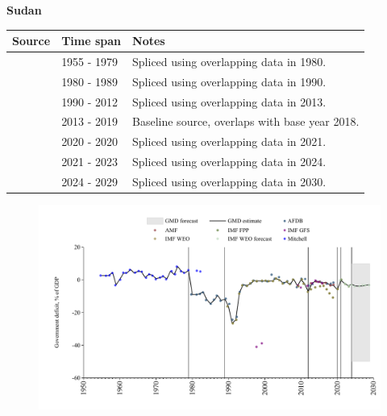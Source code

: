 \documentclass[12pt,a4paper,landscape]{article}
\begin{document}
\begin{adjustbox}{max totalsize={\paperwidth}{\paperheight},center}
\begin{minipage}[t][\textheight][t]{\textwidth}
\vspace*{0.5cm}
{}
\begin{center}
{\Large\bfseries Sudan}
\end{center}
\vspace{0.5cm}
\begin{table}[H]
\centering
\small
\begin{tabular}{|l|l|l|}
\hline
\textbf{Source} & \textbf{Time span} & \textbf{Notes} \\
\hline
\rowcolor{white}\cite{Mitchell}& 1955 - 1979 &Spliced using overlapping data in 1980.\\
\rowcolor{lightgray}\cite{AFDB}& 1980 - 1989 &Spliced using overlapping data in 1990.\\
\rowcolor{white}\cite{IMF_WEO}& 1990 - 2012 &Spliced using overlapping data in 2013.\\
\rowcolor{lightgray}\cite{AMF}& 2013 - 2019 &Baseline source, overlaps with base year 2018.\\
\rowcolor{white}\cite{IMF_WEO}& 2020 - 2020 &Spliced using overlapping data in 2021.\\
\rowcolor{lightgray}\cite{IMF_FPP}& 2021 - 2023 &Spliced using overlapping data in 2024.\\
\rowcolor{white}\cite{IMF_WEO_forecast}& 2024 - 2029 &Spliced using overlapping data in 2030.\\
\hline
\end{tabular}
\end{table}
\begin{figure}[H]
\centering
\includegraphics[width=\textwidth,height=0.6\textheight,keepaspectratio]{graphs/SDN_govdef_GDP.pdf}
\end{figure}
\end{minipage}
\end{adjustbox}
\end{document}
